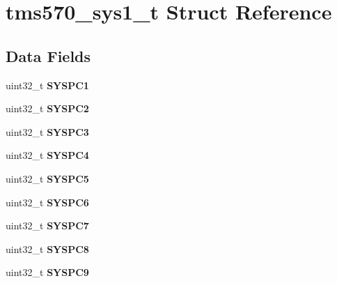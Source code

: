 \hypertarget{structtms570__sys1__t}{}\section{tms570\+\_\+sys1\+\_\+t Struct Reference}
\label{structtms570__sys1__t}
\subsection*{Data Fields}
\begin{DoxyCompactItemize}
\item 
\mbox{\label{structtms570__sys1__t_a2fec2c9318368c4c6f28036493f46b53}} 
uint32\+\_\+t {\bfseries S\+Y\+S\+P\+C1}
\item 
\mbox{\label{structtms570__sys1__t_ac5689275c068c69ea01bd0a976af867b}} 
uint32\+\_\+t {\bfseries S\+Y\+S\+P\+C2}
\item 
\mbox{\label{structtms570__sys1__t_a6346cf09e23127a3f52364461b0b683d}} 
uint32\+\_\+t {\bfseries S\+Y\+S\+P\+C3}
\item 
\mbox{\label{structtms570__sys1__t_a7271a31bbad8104d36921173d2168225}} 
uint32\+\_\+t {\bfseries S\+Y\+S\+P\+C4}
\item 
\mbox{\label{structtms570__sys1__t_ac2bff742b60db3cae739e1c797c3ab1c}} 
uint32\+\_\+t {\bfseries S\+Y\+S\+P\+C5}
\item 
\mbox{\label{structtms570__sys1__t_a7dc5c045a2d4f4b9c15150659f6ebe09}} 
uint32\+\_\+t {\bfseries S\+Y\+S\+P\+C6}
\item 
\mbox{\label{structtms570__sys1__t_a074e5c1f8a44916556248ec815c884d0}} 
uint32\+\_\+t {\bfseries S\+Y\+S\+P\+C7}
\item 
\mbox{\label{structtms570__sys1__t_a2c69ac7f8c79cd49a89ff103a43b24ed}} 
uint32\+\_\+t {\bfseries S\+Y\+S\+P\+C8}
\item 
\mbox{\label{structtms570__sys1__t_ae4c9c4baf65b49de85215be375bba752}} 
uint32\+\_\+t {\bfseries S\+Y\+S\+P\+C9}

\end{DoxyCompactItemize}
